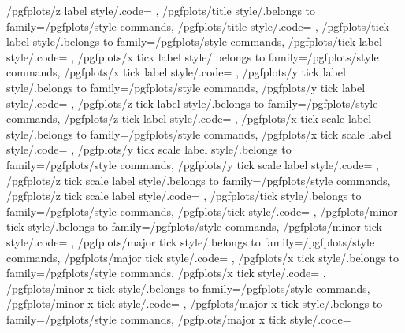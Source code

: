 {	/pgfplots/z label style/.code={%
	},
	/pgfplots/title style/.belongs to family=/pgfplots/style commands,
	/pgfplots/title style/.code={%
	},
	/pgfplots/tick label style/.belongs to family=/pgfplots/style commands,
	/pgfplots/tick label style/.code={%
	},
	/pgfplots/x tick label style/.belongs to family=/pgfplots/style commands,
	/pgfplots/x tick label style/.code={%
	},
	/pgfplots/y tick label style/.belongs to family=/pgfplots/style commands,
	/pgfplots/y tick label style/.code={%
	},
	/pgfplots/z tick label style/.belongs to family=/pgfplots/style commands,
	/pgfplots/z tick label style/.code={%
	},
	/pgfplots/x tick scale label style/.belongs to family=/pgfplots/style commands,
	/pgfplots/x tick scale label style/.code={%
	},
	/pgfplots/y tick scale label style/.belongs to family=/pgfplots/style commands,
	/pgfplots/y tick scale label style/.code={%
	},
	/pgfplots/z tick scale label style/.belongs to family=/pgfplots/style commands,
	/pgfplots/z tick scale label style/.code={%
	},
	/pgfplots/tick style/.belongs to family=/pgfplots/style commands,
	/pgfplots/tick style/.code={%
	},
	/pgfplots/minor tick style/.belongs to family=/pgfplots/style commands,
	/pgfplots/minor tick style/.code={%
	},
	/pgfplots/major tick style/.belongs to family=/pgfplots/style commands,
	/pgfplots/major tick style/.code={%
	},
	/pgfplots/x tick style/.belongs to family=/pgfplots/style commands,
	/pgfplots/x tick style/.code={%
	},
	/pgfplots/minor x tick style/.belongs to family=/pgfplots/style commands,
	/pgfplots/minor x tick style/.code={%
	},
	/pgfplots/major x tick style/.belongs to family=/pgfplots/style commands,
	/pgfplots/major x tick style/.code={%
}}
